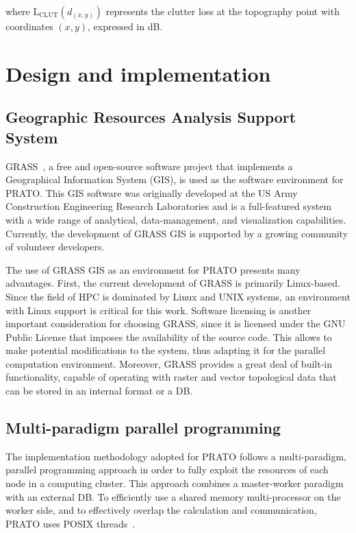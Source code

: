 \noindent where $\mathrm{L}{}_{\mathrm{CLUT}}(d_{(x,y)})$ represents
the clutter loss at the topography point with coordinates $(x,y)$,
expressed in dB.


\section{Design and implementation \label{sec:04-Design_and_implementation}}


\subsection{Geographic Resources Analysis Support System}

GRASS~\cite{Neteler_Open_source_GIS_a_GRASS_GIS_approach}, a free
and open-source software project that implements a Geographical Information
System (GIS),
is used as the software environment for PRATO. This GIS software was
originally developed at the US Army Construction Engineering Research
Laboratories and is a full-featured system with a wide range of analytical,
data-management, and visualization capabilities. Currently, the development
of GRASS GIS is supported by a growing community of volunteer developers.

The use of GRASS GIS as an environment for PRATO presents many advantages.
First, the current development of GRASS is primarily Linux-based.
Since the field of HPC is dominated by Linux and UNIX systems, an
environment with Linux support is critical for this work. Software
licensing is another important consideration for choosing GRASS, since
it is licensed under the GNU Public License \cite{Stallman_GNU_License:1991}
that imposes the availability of the source code. This allows to make
potential modifications to the system, thus adapting it for the parallel
computation environment. Moreover, GRASS provides a great deal of
built-in functionality, capable of operating with raster and vector
topological data that can be stored in an internal format or a DB.


\subsection{Multi-paradigm parallel programming}

The implementation methodology adopted for PRATO follows a multi-paradigm,
parallel programming approach in order to fully exploit the resources
of each node in a computing cluster. This approach combines a master-worker
paradigm with an external DB. To efficiently use a shared memory multi-processor
on the worker side, and to effectively overlap the calculation and
communication, PRATO uses POSIX threads~\cite{Butenhof_Programming.with.POSIX.threads:1997}.

